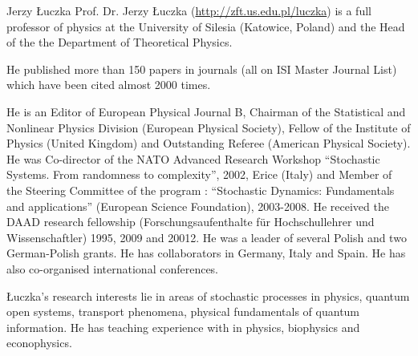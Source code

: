 
\begin{participant}[type=PI,PM=12,salary=2500,gender=male]{Jerzy Łuczka}
Prof. Dr. Jerzy Łuczka (\url{http://zft.us.edu.pl/luczka}) is
a full professor of physics at the University of Silesia (Katowice,
Poland) and the Head of the the Department of Theoretical Physics.

He published more than 150 papers in journals (all on ISI Master
Journal List) which have been cited almost 2000 times.

He is an Editor of European Physical Journal B, Chairman of the
Statistical and Nonlinear Physics Division (European Physical
Society), Fellow of the Institute of Physics (United Kingdom) and
Outstanding Referee (American Physical Society). He was Co-director of
the NATO Advanced Research Workshop ``Stochastic Systems. From
randomness to complexity'', 2002, Erice (Italy) and Member of the
Steering Committee of the program : ``Stochastic Dynamics: Fundamentals
and applications'' (European Science Foundation), 2003-2008.  He
received the DAAD research fellowship (Forschungsaufenthalte für
Hochschullehrer und Wissenschaftler) 1995, 2009 and 20012. He was a
leader of several Polish and two German-Polish grants. He has
collaborators in Germany, Italy and Spain. He has also co-organised
international conferences.

Łuczka’s research interests lie in areas of stochastic processes in
physics, quantum open systems, transport phenomena, physical
fundamentals of quantum information. He has teaching experience with
\Sage in physics, biophysics and econophysics.


\end{participant}

